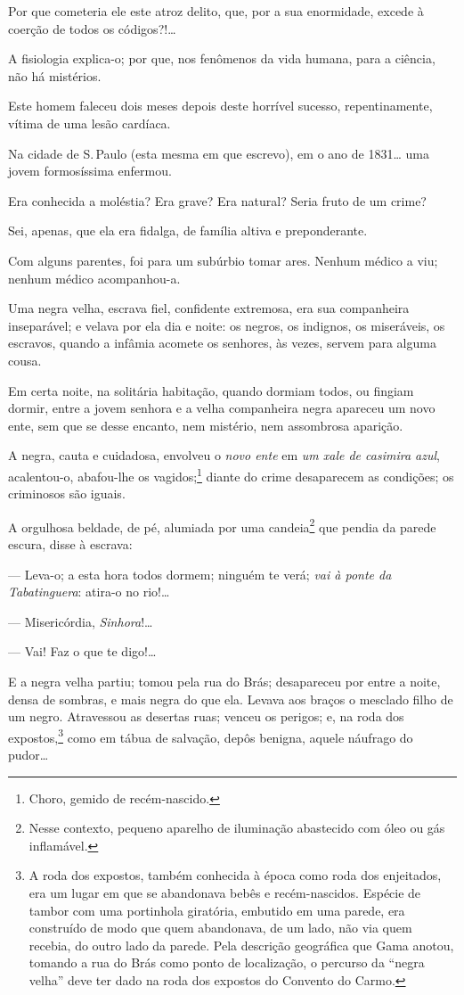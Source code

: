 Por que cometeria ele este atroz delito, que, por a sua enormidade,
excede à coerção de todos os códigos?!\ldots{}

A fisiologia explica-o; por que, nos fenômenos da vida humana, para a
ciência, não há mistérios.

Este homem faleceu dois meses depois deste horrível sucesso,
repentinamente, vítima de uma lesão cardíaca.

\asterisc

Na cidade de S.\,Paulo (esta mesma em que escrevo), em o ano de
1831\ldots{} uma jovem formosíssima enfermou.

Era conhecida a moléstia? Era grave? Era natural? Seria fruto de um
crime?

Sei, apenas, que ela era fidalga, de família altiva e preponderante.

Com alguns parentes, foi para um subúrbio tomar ares. Nenhum médico a
viu; nenhum médico acompanhou-a.

Uma negra velha, escrava fiel, confidente extremosa, era sua companheira
inseparável; e velava por ela dia e noite: os negros, os indignos, os
miseráveis, os escravos, quando a infâmia acomete os senhores, às vezes,
servem para alguma cousa.

Em certa noite, na solitária habitação, quando dormiam todos, ou fingiam
dormir, entre a jovem senhora e a velha companheira negra apareceu um
novo ente, sem que se desse encanto, nem mistério, nem assombrosa
aparição.

A negra, cauta e cuidadosa, envolveu o \emph{novo ente} em \emph{um xale
de casimira azul}, acalentou-o, abafou-lhe os vagidos;\footnote{Choro,
  gemido de recém-nascido.} diante do crime desaparecem as condições;
os criminosos são iguais.

A orgulhosa beldade, de pé, alumiada por uma candeia\footnote{Nesse
  contexto, pequeno aparelho de iluminação abastecido com óleo ou gás
  inflamável.} que pendia da parede escura, disse à escrava:

  --- Leva-o; a esta hora todos dormem; ninguém te verá; \emph{vai à
  ponte da Tabatinguera}: atira-o no rio!\ldots{}

  --- Misericórdia, \emph{Sinhora}!\ldots{}

  --- Vai! Faz o que te digo!\ldots{}

E a negra velha partiu; tomou pela rua do Brás; desapareceu por entre a
noite, densa de sombras, e mais negra do que ela. Levava aos braços o
mesclado filho de um negro. Atravessou as desertas ruas; venceu os
perigos; e, na roda dos expostos,\footnote{A roda dos expostos, também
  conhecida à época como roda dos enjeitados, era um lugar em que se
  abandonava bebês e recém-nascidos. Espécie de tambor com uma
  portinhola giratória, embutido em uma parede, era construído de modo
  que quem abandonava, de um lado, não via quem recebia, do outro lado
  da parede. Pela descrição geográfica que Gama anotou, tomando a rua do
  Brás como ponto de localização, o percurso da ``negra velha'' deve ter
  dado na roda dos expostos do Convento do Carmo.} como em tábua de
salvação, depôs benigna, aquele náufrago do pudor\ldots{}

